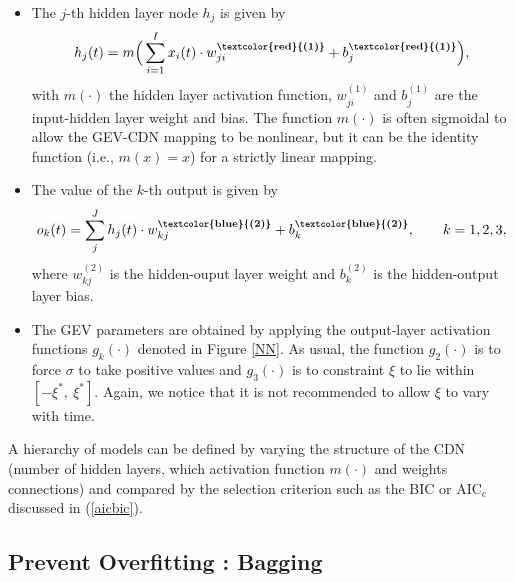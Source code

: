 \begin{itemize} 

\item The $j$-th hidden layer node $h_j$ is given by 
\begin{equation}\label{eq:nnlay1}
h_j(t)=m\Big(\sum_{i=1}^{I}x_i(t)\cdot  w_{ji}^{\textbf{\textcolor{red}{(1)}}}+b_j^{\textbf{\textcolor{red}{(1)}}}\Big),
\end{equation}
with $m(\cdot)$ the hidden layer activation function, $w_{ji}^{(1)}$ and $b_j^{(1)}$ are the input-hidden layer weight and bias. The function $m(\cdot)$ is often sigmoidal to allow the GEV-CDN mapping to be nonlinear, but it can be the identity function (i.e., $m(x)=x$) for a strictly linear mapping.

\item The value of the $k$-th output is given by 
\begin{equation}\label{eq:nnlay2}
o_k(t)=\sum_j^Jh_j(t)\cdot w_{kj}^{\textbf{\textbf{\textcolor{blue}{(2)}}}}+b^{\textbf{\textbf{\textcolor{blue}{(2)}}}}_k, \qquad k=1,2,3 ,
\end{equation}
where $w_{kj}^{(2)}$ is the hidden-ouput layer weight and $b^{(2)}_k$ is the hidden-output layer bias.
	
\item The GEV parameters are obtained by applying the output-layer activation functions $g_k(\cdot)$ denoted in Figure \ref{NN}. As usual, the function $g_2(\cdot)$ is to force $\sigma$ to take positive values and $g_3(\cdot)$ is to constraint $\xi$ to lie within $[-\xi^{*},\ \xi^{*}]$. Again, we notice that it is not recommended to allow $\xi$ to vary with time. 
	
\end{itemize}
A hierarchy of models can be defined by varying the structure of the CDN (number of hidden layers, which activation function $m(\cdot)$ and weights connections)  and compared by the selection criterion such as the BIC or $\text{AIC}_{\text{c}}$ discussed in (\ref{aicbic}). 


\subsection{Prevent Overfitting : Bagging}\label{sec:bagg} 


